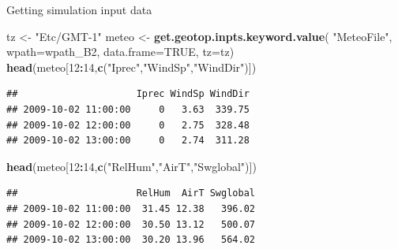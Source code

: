 \documentclass[ignorenonframetext,]{beamer}
\newenvironment{Shaded}{\begin{snugshade}}{\end{snugshade}}
\newcommand{\DataTypeTok}[1]{\textcolor[rgb]{0.13,0.29,0.53}{#1}}
\newcommand{\DecValTok}[1]{\textcolor[rgb]{0.00,0.00,0.81}{#1}}
\newcommand{\KeywordTok}[1]{\textcolor[rgb]{0.13,0.29,0.53}{\textbf{#1}}}
\newcommand{\NormalTok}[1]{#1}
\newcommand{\OperatorTok}[1]{\textcolor[rgb]{0.81,0.36,0.00}{\textbf{#1}}}
\newcommand{\OtherTok}[1]{\textcolor[rgb]{0.56,0.35,0.01}{#1}}
\newcommand{\StringTok}[1]{\textcolor[rgb]{0.31,0.60,0.02}{#1}}
\begin{document}
\begin{frame}[fragile]{Getting simulation input data}
\protect\hypertarget{getting-simulation-input-data}{}

\begin{Shaded}
\begin{Highlighting}[]
\NormalTok{tz <-}\StringTok{ "Etc/GMT-1"}
\NormalTok{meteo <-}\StringTok{ }\KeywordTok{get.geotop.inpts.keyword.value}\NormalTok{(}
  \StringTok{"MeteoFile"}\NormalTok{,}
  \DataTypeTok{wpath=}\NormalTok{wpath_B2,}
  \DataTypeTok{data.frame=}\OtherTok{TRUE}\NormalTok{,}
  \DataTypeTok{tz=}\NormalTok{tz)}
\KeywordTok{head}\NormalTok{(meteo[}\DecValTok{12}\OperatorTok{:}\DecValTok{14}\NormalTok{,}\KeywordTok{c}\NormalTok{(}\StringTok{"Iprec"}\NormalTok{,}\StringTok{"WindSp"}\NormalTok{,}\StringTok{"WindDir"}\NormalTok{)])}
\end{Highlighting}
\end{Shaded}

\begin{verbatim}
##                     Iprec WindSp WindDir
## 2009-10-02 11:00:00     0   3.63  339.75
## 2009-10-02 12:00:00     0   2.75  328.48
## 2009-10-02 13:00:00     0   2.74  311.28
\end{verbatim}

\begin{Shaded}
\begin{Highlighting}[]
\KeywordTok{head}\NormalTok{(meteo[}\DecValTok{12}\OperatorTok{:}\DecValTok{14}\NormalTok{,}\KeywordTok{c}\NormalTok{(}\StringTok{"RelHum"}\NormalTok{,}\StringTok{"AirT"}\NormalTok{,}\StringTok{"Swglobal"}\NormalTok{)])}
\end{Highlighting}
\end{Shaded}

\begin{verbatim}
##                     RelHum  AirT Swglobal
## 2009-10-02 11:00:00  31.45 12.38   396.02
## 2009-10-02 12:00:00  30.50 13.12   500.07
## 2009-10-02 13:00:00  30.20 13.96   564.02
\end{verbatim}

\end{frame}
\end{document}
